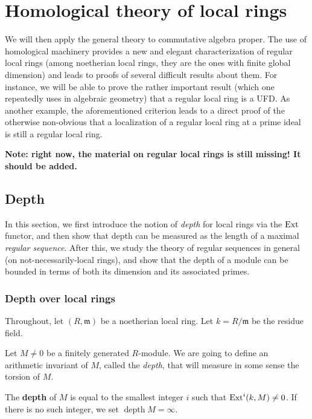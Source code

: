\chapter{Homological theory of local rings}

We will then apply the general theory to commutative algebra proper. The use
of homological machinery provides a new and elegant characterization of regular local
rings (among noetherian local rings, they are the ones with finite global
dimension) and leads to proofs of several difficult results about them.
For instance, we will be able to prove the rather important result (which one
repeatedly uses in algebraic geometry) that a
regular local ring is a UFD.
As another example, the aforementioned criterion leads to a direct proof of
the otherwise non-obvious that a localization of a regular local ring at a
prime ideal is still a regular local ring.

\textbf{Note: right now, the material on regular local rings is still missing!
It should be added.}

\section{Depth}

In this section, we first introduce the notion of \emph{depth} for local rings
via the $\operatorname{Ext}$ functor, and then show that depth can be measured as the length
of a maximal \emph{regular sequence}. After this, we study the theory of
regular sequences in general (on not-necessarily-local rings), and show that
the depth of a module can be bounded in terms of both its dimension and its
associated primes. 
\subsection{Depth over local rings}

Throughout, let $(R, \mathfrak{m})$ be  a noetherian
local ring. Let $k = R/\mathfrak{m}$ be the residue field. 

Let $M \neq 0$ be a finitely generated $R$-module. We are going to define an
arithmetic invariant of $M$, called the \emph{depth}, that will measure in
some sense the torsion of $M$.

\newcommand{\depth}{\operatorname{depth}}
\begin{definition}
The \textbf{depth} of $M$ is equal to the smallest integer $i$
such that
$\operatorname{Ext}^i(k,M) \neq 0$. If there is no such integer, we set $\depth M = \infty$.
\end{definition}

